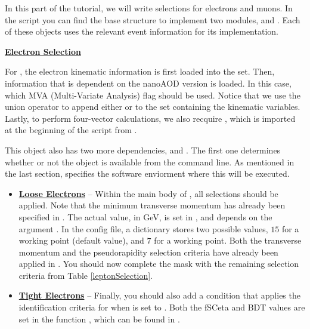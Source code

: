 In this part of the tutorial, we will write selections for electrons and muons.
In the script  you can find the base structure to implement two  modules,  and .
Each of these objects uses the relevant event information for its implementation.


\textbf{\underline{Electron Selection}}

For , the electron kinematic information is first loaded into the  set.
Then, information that is dependent on the nanoAOD version is loaded. In this case, which MVA (Multi-Variate Analysis) flag should be used.
Notice that we use the union operator \code{|} to append either  or  to the set containing the kinematic variables.
Lastly, to perform four-vector calculations, we also recquire , which is imported at the beginning of the script from .


This  object also has two more dependencies,  and .
The first one determines whether or not the  object is available from the command line.
As mentioned in the last section,  specifies the software enviorment where this  will be executed.

\newpage
\begin{itemize}
    \item {
        \textbf{\underline{Loose Electrons}} -- Within the main body of , all selections should be applied.
        Note that the minimum transverse momentum has already been specified in .
        The actual value, in GeV, is set in , and depends on the argument .
        In the config file, a dictionary stores two possible values, $15$ for a  working point (default value), and $7$ for a  working point.
        Both the transverse momentum and the pseudorapidity selection criteria have already been applied in .
        You should now complete the mask with the remaining selection criteria from Table \ref{leptonSelection}.
    }
    \item {
        \textbf{\underline{Tight Electrons}} -- Finally, you should also add a condition that applies the identification criteria for when  is set to .
        Both the fSCeta and BDT values are set in the function , which can be found in .
    }
\end{itemize}

